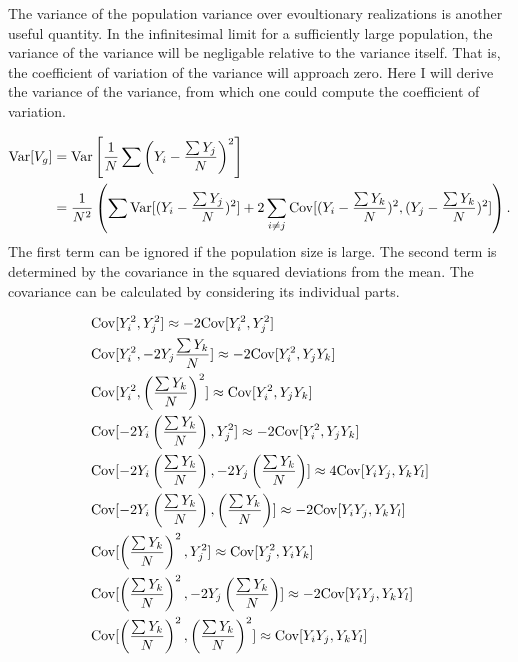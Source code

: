 The variance of the population variance over evoultionary realizations is
another useful quantity. In the infinitesimal limit for a sufficiently large
population, the variance of the variance will be negligable relative to the
variance itself. That is, the coefficient of variation of the variance will
approach zero. Here I will derive the variance of the variance, from which one
could compute the coefficient of variation.

\begin{align}
  \label{eq:popvarvar}
  \mathrm{Var}[V_g] &= \mathrm{Var}\left[ \frac{1}{N}\sum \left( Y_i - \frac{\sum Y_j}{N} \right)^2\right] \nonumber \\
            &= \frac{1}{N^2}\left( \sum \mathrm{Var}[(Y_i - \frac{\sum Y_j}{N})^2] + 2 \sum_{i \neq j} 
              \mathrm{Cov}[(Y_i - \frac{\sum Y_k}{N})^2, (Y_j - \frac{\sum Y_k}{N})^2]\right).
\end{align}
The first term can be ignored if the population size is large. The second term
is determined by the covariance in the squared deviations from the mean. The
covariance can be calculated by considering its individual parts. 

\begin{align*}
  &\mathrm{Cov}[Y_i^2, Y_j^2] \approx -2\mathrm{Cov}[Y_i^2,Y_j^2] \nonumber \\
  &\mathrm{Cov}[Y_i^2, -2Y_j \frac{\sum Y_k}{N}] \approx -2\mathrm{Cov}[Y_i^2,Y_jY_k] \nonumber \\
  &\mathrm{Cov}[Y_i^2, \left(\frac{\sum Y_k}{N}\right)^2] \approx \mathrm{Cov}[Y_i^2,Y_jY_k] \nonumber \\
  &\mathrm{Cov}[-2Y_i\left(\frac{\sum Y_k}{N}\right), Y_j^2] \approx -2\mathrm{Cov}[Y_i^2,Y_jY_k] \nonumber \\
  &\mathrm{Cov}[-2Y_i\left(\frac{\sum Y_k}{N}\right),-2Y_j\left(\frac{\sum Y_k}{N}\right)] 
  \approx 4\mathrm{Cov}[Y_iY_j,Y_kY_l] \nonumber \\
  &\mathrm{Cov}[-2Y_i\left(\frac{\sum Y_k}{N}\right), \left(\frac{\sum Y_k}{N}\right)] 
  \approx -2\mathrm{Cov}[Y_iY_j,Y_kY_l] \nonumber \\
  &\mathrm{Cov}[\left(\frac{\sum Y_k}{N}\right)^2, Y_j^2] 
  \approx \mathrm{Cov}[Y_j^2,Y_iY_k] \nonumber \\
  &\mathrm{Cov}[\left(\frac{\sum Y_k}{N}\right)^2,-2Y_j\left(\frac{\sum Y_k}{N}\right)] 
  \approx -2\mathrm{Cov}[Y_iY_j,Y_kY_l] \nonumber \\
  &\mathrm{Cov}[\left(\frac{\sum Y_k}{N}\right)^2,\left(\frac{\sum Y_k}{N}\right)^2] 
  \approx \mathrm{Cov}[Y_iY_j,Y_kY_l] \nonumber
\end{align*}

